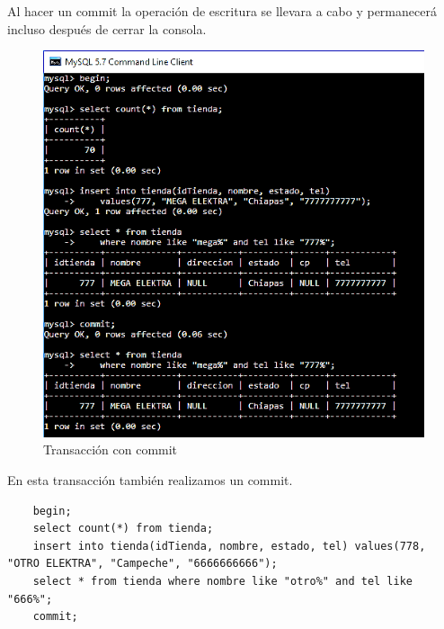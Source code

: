 \documentclass[12pt, titlepage]{article}
\begin{document}
	Al hacer un commit la operación de escritura se llevara a cabo y permanecerá incluso después de cerrar la consola.

	\begin{figure}[H]
		\begin{center}
			\includegraphics[width=\textwidth]{img/tres.png}
			\caption{Transacción con commit}
			\label{fig:tres}
		\end{center}
	\end{figure}
	
	En esta transacción también realizamos un commit.
	\begin{lstlisting}
	begin;
	select count(*) from tienda;
	insert into tienda(idTienda, nombre, estado, tel) values(778, "OTRO ELEKTRA", "Campeche", "6666666666");
	select * from tienda where nombre like "otro%" and tel like "666%";
	commit;
	\end{lstlisting}
	
\end{document}
